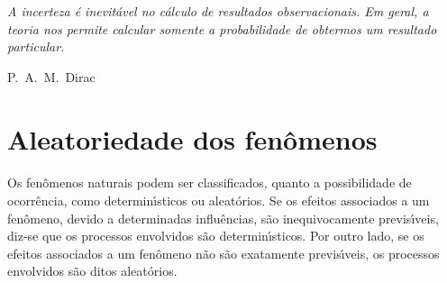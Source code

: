 \newpage
\thispagestyle{empty}



\vspace{1cm}



\setcounter{chapter}{1}
\setcounter{equation}{0}

\label{Intro}



\begin{flushright}
\begin{minipage}{6.5cm}
{\small
\baselineskip=8.5pt
{\it A incerteza \'{e} inevit\'{a}vel no c\'{a}lculo de resultados obser\-va\-cio\-nais. Em geral,  a teoria nos permite calcular somente a probabilidade de obtermos um resultado particular.}

\smallskip
\hfill P.~A.~M.~Dirac
}
\end{minipage}
\end{flushright}



\section{Aleatoriedade dos fen\^{o}menos}  

\paragraph*{}
Os fen\^{o}menos naturais podem ser classificados, quanto a possibilidade de ocorr\^{e}ncia, como determin\'{\i}sticos ou aleat\'{o}rios. Se os efeitos associados  a um fen\^{o}meno, devido a determinadas influ\^{e}ncias,  s\~{a}o inequivocamente previs\'{\i}veis, diz-se que os processos envolvidos s\~{a}o determin\'{\i}sticos. Por outro lado, se os efeitos associados a um fen\^{o}meno n\~{a}o s\~{a}o exatamente previs\'{\i}veis,
os processos envolvidos s\~{a}o ditos aleat\'{o}rios.

